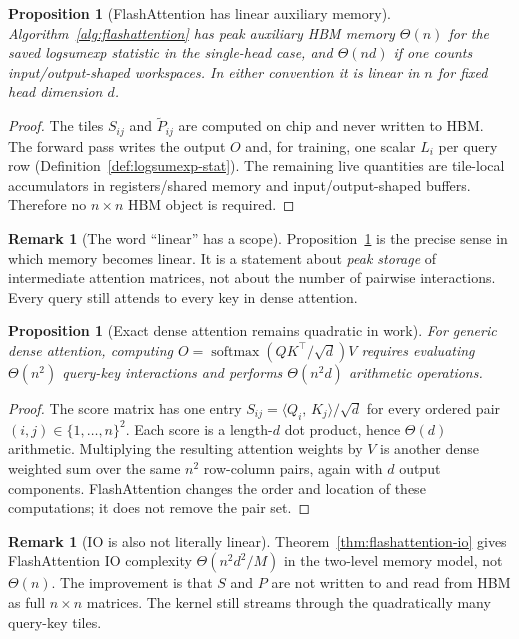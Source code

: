 \documentclass[11pt]{amsart}
\theoremstyle{plain}
\newtheorem{proposition}[theorem]{Proposition}
\theoremstyle{definition}
\newtheorem{remark}[theorem]{Remark}
\newcommand{\softmax}{\operatorname{softmax}}
\newcommand{\inner}[2]{\langle #1,\, #2 \rangle}
\begin{document}
\begin{proposition}[FlashAttention has linear auxiliary memory]
\label{prop:flash-linear-aux-memory}
Algorithm~\ref{alg:flashattention} has peak auxiliary HBM memory
$\Theta(n)$ for the saved logsumexp statistic in the single-head case, and
$\Theta(nd)$ if one counts input/output-shaped workspaces.  In either
convention it is linear in $n$ for fixed head dimension $d$.
\end{proposition}
\begin{proof}
The tiles $S_{ij}$ and $\tilde{P}_{ij}$ are computed on chip and never
written to HBM.  The forward pass writes the output $O$ and, for training,
one scalar $L_i$ per query row (Definition~\ref{def:logsumexp-stat}).  The
remaining live quantities are tile-local accumulators in registers/shared
memory and input/output-shaped buffers.  Therefore no $n\times n$ HBM object
is required.
\end{proof}

\begin{remark}[The word ``linear'' has a scope]
Proposition~\ref{prop:flash-linear-aux-memory} is the precise sense in which
memory becomes linear.  It is a statement about \emph{peak storage} of
intermediate attention matrices, not about the number of pairwise interactions.
Every query still attends to every key in dense attention.
\end{remark}

\begin{proposition}[Exact dense attention remains quadratic in work]
\label{prop:exact-attention-quadratic-work}
For generic dense attention, computing $O=\softmax(QK^\top/\sqrt{d})V$
requires evaluating $\Theta(n^2)$ query-key interactions and performs
$\Theta(n^2d)$ arithmetic operations.
\end{proposition}
\begin{proof}
The score matrix has one entry $S_{ij}=\inner{Q_i}{K_j}/\sqrt{d}$ for every
ordered pair $(i,j)\in\{1,\ldots,n\}^2$.  Each score is a length-$d$ dot
product, hence $\Theta(d)$ arithmetic.  Multiplying the resulting attention
weights by $V$ is another dense weighted sum over the same $n^2$ row-column
pairs, again with $d$ output components.  FlashAttention changes the order and
location of these computations; it does not remove the pair set.
\end{proof}

\begin{remark}[IO is also not literally linear]
Theorem~\ref{thm:flashattention-io} gives FlashAttention IO complexity
$\Theta(n^2d^2/M)$ in the two-level memory model, not $\Theta(n)$.
The improvement is that $S$ and $P$ are not written to and read from HBM as
full $n\times n$ matrices.  The kernel still streams through the
quadratically many query-key tiles.
\end{remark}
\end{document}
